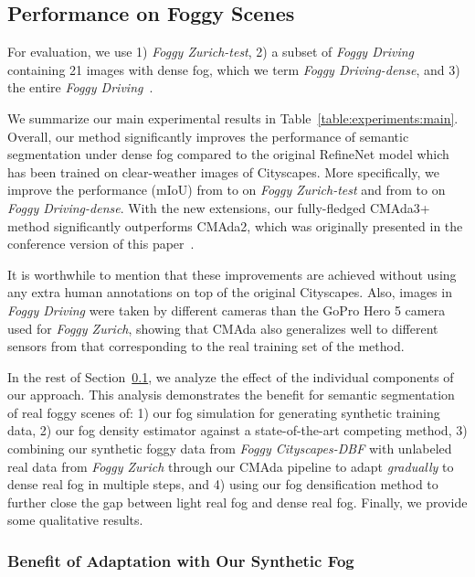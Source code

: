 \documentclass[twocolumn]{svjour3}          \smartqed  \usepackage{graphicx}
\begin{document}
\subsection{Performance on Foggy Scenes}
\label{sec:experiments:foggy}

For evaluation, we use 1) \emph{Foggy Zurich-test}, 2) a subset of \emph{Foggy Driving}~\cite{SFSU_synthetic} containing 21 images with dense fog, which we term \emph{Foggy Driving-dense}, and 3) the entire \emph{Foggy Driving}~\cite{SFSU_synthetic}.

We summarize our main experimental results in Table~\ref{table:experiments:main}. Overall, our method significantly improves the performance of semantic segmentation under dense fog compared to the original RefineNet model which has been trained on clear-weather images of Cityscapes. More specifically, we improve the performance (mIoU) from  to  on \emph{Foggy Zurich-test} and from  to  on \emph{Foggy Driving-dense}. With the new extensions, our fully-fledged CMAda3+ method significantly outperforms CMAda2, which was originally presented in the conference version of this paper~\cite{dense:SFSU:eccv18}.

It is worthwhile to mention that these improvements are achieved without using any extra human annotations on top of the original Cityscapes. Also, images in \emph{Foggy Driving} were taken by different cameras than the GoPro Hero 5 camera used for \emph{Foggy Zurich}, showing that CMAda also generalizes well to different sensors from that corresponding to the real training set of the method.

In the rest of Section~\ref{sec:experiments:foggy}, we analyze the effect of the individual components of our approach. This analysis demonstrates the benefit for semantic segmentation of real foggy scenes of: 1) our fog simulation for generating synthetic training data, 2) our fog density estimator against a state-of-the-art competing method, 3) combining our synthetic foggy data from \emph{Foggy Cityscapes-DBF} with unlabeled real data from \emph{Foggy Zurich} through our CMAda pipeline to adapt \emph{gradually} to dense real fog in multiple steps, and 4) using our fog densification method to further close the gap between light real fog and dense real fog. Finally, we provide some qualitative results.

\subsubsection{Benefit of Adaptation with Our Synthetic Fog}
\label{sec:experiments:synthetic}
\end{document}
